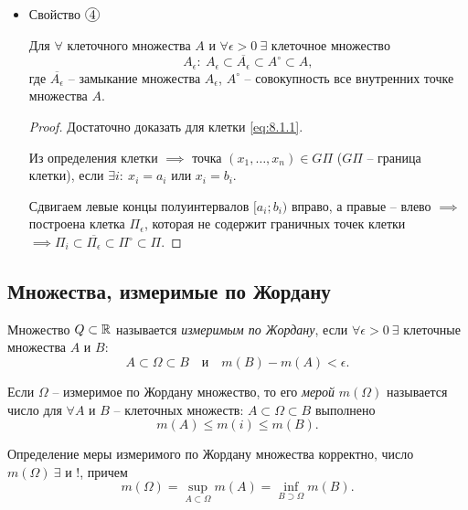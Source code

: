 \begin{itemize}
    \item Свойство $ \circled{4} $
          \begin{statement}
              Для $ \forall $ клеточного множества $ A $ и $ \forall \epsilon > 0 \ \exists $ клеточное множество
              \[
                  A_\epsilon : \ A_\epsilon \subset \overline{A_\epsilon} \subset A^\circ \subset A,
              \]
              где $ \overline{A_\epsilon} $ -- замыкание множества $ A_\epsilon $, $ A^\circ $ -- совокупность все внутренних точке множества $ A $.
          \end{statement}
          \begin{proof}
              Достаточно доказать для клетки \ref{eq:8.1.1}.

              Из определения клетки $ \implies $ точка $ (x_1,\ldots,x_n) \in G\Pi $ ($ G\Pi $ -- граница клетки), если $ \exists i : \ x_i = a_i $ или $ x_i = b_i $.

              Сдвигаем левые концы полуинтервалов $ [a_i;b_i) $ вправо, а правые -- влево $ \implies $ построена клетка $ \Pi_\epsilon $, которая не содержит граничных точек клетки $ \implies \Pi_i \subset \overline{\Pi_\epsilon} \subset \Pi^\circ \subset \Pi $.
          \end{proof}
\end{itemize}

\subsection{Множества, измеримые по Жордану}

\begin{definition}
    Множество $ Q \subset \mathbb{R} $ называется \emph{измеримым по Жордану}, если $ \forall \epsilon > 0 \ \exists $ клеточные множества $ A $ и $ B $:
    \[
        A \subset \Omega \subset B \quad \text{и} \quad m(B) - m(A) < \epsilon.
    \]
\end{definition}

\begin{definition}
    Если $ \Omega $ -- измеримое по Жордану множество, то его \emph{мерой} $ m(\Omega) $ называется число для $ \forall A $ и $ B $ -- клеточных множеств: $ A \subset \Omega \subset B $ выполнено
    \[
        m(A) \leqslant m(i) \leqslant m(B).
    \]
\end{definition}

\begin{lemma}
    Определение меры измеримого по Жордану множества корректно, число $ m(\Omega) \ \exists $ и $ ! $, причем
    \[
        m(\Omega) = \underset{A\subset\Omega}{\sup}m(A) = \underset{B\supset\Omega}{\inf}m(B).
    \]
\end{lemma}

